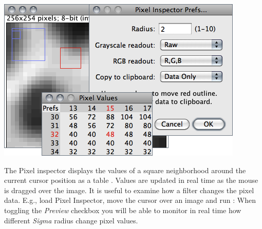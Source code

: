 \begin{minipage}[c][1\totalheight][t]{0.605\columnwidth}%
\includegraphics[scale=0.55]{images/PixelInspector}%
\end{minipage}%
\begin{minipage}[c][1\totalheight][t]{0.395\columnwidth}%
The Pixel inspector displays the values of a square neighborhood around
the current cursor position as a table \cite{C-PixelInspector}. Values
are updated in real time as the mouse is dragged over the image. It
is useful to examine how a filter changes the pixel data. E.g., load
Pixel Inspector, move the cursor over an image and run :
When toggling the \emph{Preview} checkbox you will be able to monitor
in real time how different \emph{Sigma} radius change pixel values.%
\end{minipage}

